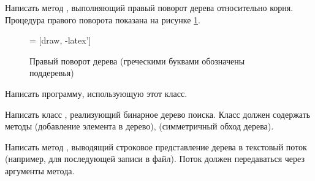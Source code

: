Написать метод , выполняющий правый поворот дерева
относительно корня. Процедура правого поворота показана на рисунке
\ref{fig:rotate}.

\begin{figure}
  \begin{centering}
     = [draw, -latex']
    \usetikzlibrary{shapes,positioning}
    \par
  \end{centering}

  \caption{Правый поворот дерева (греческими буквами обозначены
    поддеревья)\label{fig:rotate}}
\end{figure}

Написать программу, использующую этот класс.

\task Написать класс , реализующий бинарное дерево
поиска. Класс должен содержать методы  (добавление элемента в
дерево),  (симметричный обход дерева).

Написать метод , выводящий строковое представление дерева в
текстовый поток (например, для последующей записи в файл). Поток должен
передаваться через аргументы метода.

